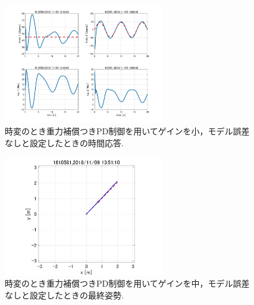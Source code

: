 \documentclass[twocolumn, 10pt,a4j]{jsarticle}
\begin{document}
    \begin{figure}[H]
      \begin{center}
        \includegraphics[width=7cm]{../img/img/kansetu_juryoku_hosyo_PD_zihen_small_no_model_gosa_zikan_auto.jpg}
        \caption{時変のとき重力補償つきPD制御を用いてゲインを小，モデル誤差なしと設定したときの時間応答.}
      \end{center}
    \end{figure}
    \begin{figure}[H]
      \begin{center}
        \includegraphics[width=7cm]{../img/img/kansetu_juryoku_hosyo_PD_zihen_chu_no_model_gosa_saisyu_sisei.jpg}
        \caption{時変のとき重力補償つきPD制御を用いてゲインを中，モデル誤差なしと設定したときの最終姿勢.}
      \end{center}
    \end{figure}
\end{document}
